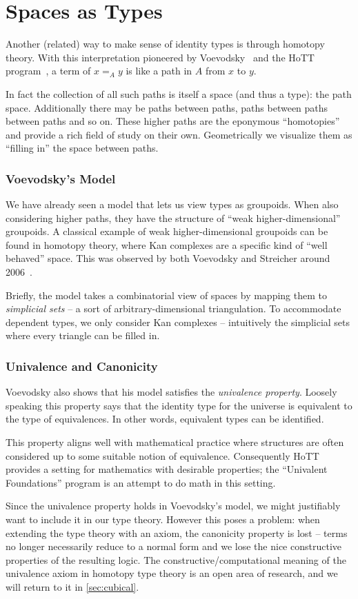 \section{Spaces as Types}\label{sec:spaces}

Another (related) way to make sense of identity types is through homotopy theory. With
this interpretation pioneered by Voevodsky~\cite{voevodsky2014} and the HoTT
program~\cite{hottbook}, a term of $x =_A y$ is like a path in $A$ from $x$ to
$y$.

In fact the collection of all such paths is itself a space (and thus a type):
the path space. Additionally there may be paths between paths, paths between
paths between paths and so on. These higher paths are the eponymous
``homotopies'' and provide a rich field of study on their own.
Geometrically we visualize them as ``filling in'' the space between paths.

\subsubsection{Voevodsky's Model}
We have already seen a model that lets us view types as groupoids. When also
considering higher paths, they have the structure of ``weak higher-dimensional''
groupoids. A classical example of weak higher-dimensional groupoids can be found
in homotopy theory, where Kan complexes are a specific kind of ``well
behaved'' space. This was observed by both Voevodsky and Streicher around
2006~\cite{streicher2014sset}.

Briefly, the model takes a combinatorial view of spaces by mapping them to
\emph{simplicial sets} -- a sort of arbitrary-dimensional triangulation. To
accommodate dependent types, we only consider Kan complexes -- intuitively the
simplicial sets where every triangle can be filled in. 

\subsubsection{Univalence and Canonicity}%
Voevodsky also shows that his model satisfies the \emph{univalence property}.
Loosely speaking this property says that the identity type for the universe is
equivalent to the type of equivalences. In other words, equivalent types can be
identified.

This property aligns well with mathematical practice where structures are often
considered up to some suitable notion of equivalence. Consequently HoTT provides
a setting for mathematics with desirable properties; the ``Univalent
Foundations'' program is an attempt to do math in this setting.

Since the univalence property holds in Voevodsky's model, we might justifiably want to
include it in our type theory. However this poses a problem: when extending the
type theory with an axiom, the canonicity property is lost -- terms no longer
necessarily reduce to a normal form and we lose the nice constructive properties
of the resulting logic. The constructive/computational meaning of the univalence
axiom in homotopy type theory is an open area of research, and we will return to
it in \autoref{sec:cubical}.